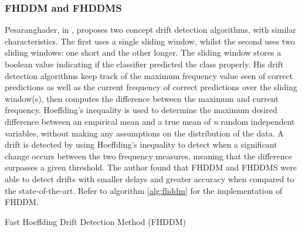 \subsubsection{FHDDM and FHDDMS\label{section:fhddm/s}}
Pesaranghader, in \parencite{pesaranghader2018reservoirthesis,pesaranghader2018reservoir, pesaranghader2016fast}, proposes two concept drift detection algorithms, with similar characteristics. The first uses a single sliding window, whilst the second uses two sliding windows: one short and the other longer. The sliding window stores a boolean value indicating if the classifier predicted the class properly. His drift detection algorithms keep track of the maximum frequency value seen of correct predictions as well as the current frequency of correct predictions over the sliding window(s), then computes the difference between the maximum and current frequency. Hoeffding's inequality is used to determine the maximum desired difference between an empirical mean and a true mean of \textit{n} random independent variables, without making any assumptions on the distribution of the data. A drift is detected by using Hoeffding's inequality to detect when a significant change occurs between the two frequency measures, meaning that the difference surpasses a given threshold. The author found that FHDDM and FHDDMS were able to detect drifts with smaller delays and greater accuracy when compared to the state-of-the-art. Refer to algorithm \ref{alg:fhddm} for the implementation of FHDDM.

\begin{algorithm}
\caption{Fast Hoeffding Drift Detection Method (FHDDM) \label{alg:fhddm}\cite{pesaranghader2018reservoirthesis,pesaranghader2018reservoir, pesaranghader2016fast}}


\end{algorithm}


